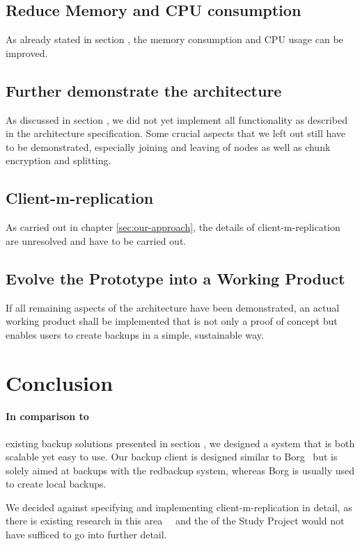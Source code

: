 \subsection{Reduce Memory and CPU consumption}
As already stated in section , the memory consumption and CPU usage can be improved.

\subsection{Further demonstrate the architecture}

As discussed in section , we did not yet implement all functionality as described in the architecture specification. Some crucial aspects that we left out still have to be demonstrated, especially joining and leaving of nodes as well as chunk encryption and splitting.

\subsection{Client-m-replication}
As carried out in chapter \ref{sec:our-approach}, the details of \gls{client-m-replication} are unresolved and have to be carried out.

\subsection{Evolve the Prototype into a Working Product}
If all remaining aspects of the architecture have been demonstrated, an actual working product shall be implemented that is not only a proof of concept but enables users to create backups in a simple, sustainable way.

\section{Conclusion}
\paragraph{In comparison to}
existing backup solutions presented in section , we designed a system that is both scalable yet easy to use. Our backup \gls{client} is designed similar to Borg~\cite{borg-backup} but is solely aimed at backups with the redbackup system, whereas Borg is usually used to create local backups.

We decided against specifying and implementing \gls{client-m-replication} in detail, as there is existing research in this area~\cite{p2p-redundancy}~\cite{p2p-scheduling} and the  of the Study Project would not have sufficed to go into further detail.

